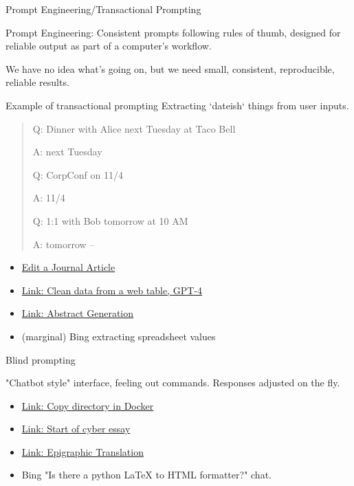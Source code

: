 \documentclass[aspectratio=169]{beamer}
\begin{document}
\begin{frame}{Prompt Engineering/Transactional Prompting}

Prompt Engineering: Consistent prompts following rules of thumb, designed for reliable output as part of a computer's workflow.

We have no idea what's going on, but we need small, consistent, reproducible, reliable results.
    
\end{frame}
\begin{frame}{Example of transactional prompting}
Extracting `dateish` things from user inputs.

    \begin{quote}
        Q: Dinner with Alice next Tuesday at Taco Bell
        
A: next Tuesday

Q: CorpConf on 11/4

A: 11/4

Q: 1:1 with Bob tomorrow at 10 AM

A: tomorrow --\parencite{Hashimoto2023-qo}
    \end{quote}

\begin{itemize}
    \item \href{https://chat.openai.com/share/1b055ec4-9ba3-49d0-ac4b-3710db02b8c1}{Edit a Journal Article}
    \item \href{https://chat.openai.com/share/7d52a80f-ae8b-4b02-9048-fd3a91416778}{Link: Clean data from a web table, GPT-4}
    \item \href{https://chat.openai.com/share/0bda34c2-a4eb-416c-a260-0fbfe340aba0}{Link: Abstract Generation}
    \item (marginal) Bing extracting spreadsheet values
\end{itemize}
    
\end{frame}
\begin{frame}{Blind prompting}

"Chatbot style" interface, feeling out commands. Responses adjusted on the fly.

\begin{itemize}
    \item \href{https://chat.openai.com/share/a879253c-cad7-4996-aea0-f2ef1a3c87ad}{Link: Copy directory in Docker}
    \item \href{https://chat.openai.com/share/10f9a2fe-e642-49a5-9474-f4d2fcb989fe}{Link: Start of cyber essay}
    \item \href{https://chat.openai.com/share/e49c3fdf-65b3-475c-97d4-bc69354cd5f0}{Link: Epigraphic Translation}
    \item Bing "Is there a python LaTeX to HTML formatter?" chat.
\end{itemize}
    
\end{frame}
\end{document}
